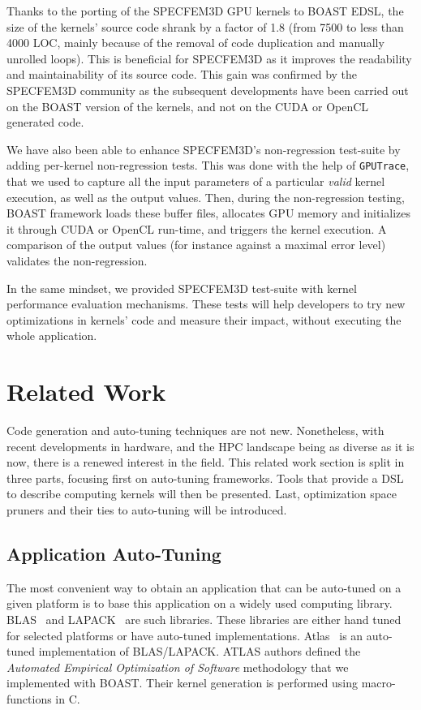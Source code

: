 \documentclass{IEEEtran}
\newcommand{\code}[1]{\texttt{#1}}
\begin{document}
Thanks to the porting of the SPECFEM3D GPU kernels to BOAST EDSL, the size of the
kernels' source code shrank by a factor of 1.8 (from 7500 to less than
4000 LOC, mainly because of the removal of code duplication and
manually unrolled loops). This is beneficial for SPECFEM3D as it
improves the readability and maintainability of its source code. This
gain was confirmed by the SPECFEM3D community as the subsequent
developments have been carried out on the BOAST version of the
kernels, and not on the CUDA or OpenCL generated code. 

We have also been able to enhance SPECFEM3D's non-regression test-suite
by adding per-kernel non-regression tests. This was done with the help
of \code{GPUTrace}, that we used to capture all the input parameters
of a particular \emph{valid} kernel execution, as well as the output
values. Then, during the non-regression testing, BOAST framework
loads these buffer files, allocates GPU memory and initializes it through
CUDA or OpenCL run-time, and triggers the kernel execution. A comparison
of the output values (for instance against a maximal error level)
validates the non-regression.

In the same mindset, we provided SPECFEM3D test-suite with kernel
performance evaluation mechanisms. These tests will help developers to
try new optimizations in kernels' code and measure their impact,
without executing the whole application.

\section{Related Work\label{sec:related}}

Code generation and auto-tuning techniques are not new. Nonetheless, with recent
developments in hardware, and the HPC landscape being as diverse as it is now,
there is a renewed interest in the field. This related work section is split in
three parts, focusing first on auto-tuning frameworks. Tools that provide a DSL
to describe computing kernels will then be presented. Last, optimization space
pruners and their ties to auto-tuning will be introduced.

\subsection{Application Auto-Tuning} 

The most convenient way to obtain an application that can be auto-tuned on a
given platform is to base this application on a widely used computing library.
BLAS~\cite{dongarra1990set} and LAPACK~\cite{laug} are such libraries. These
libraries are either hand tuned for selected platforms or have auto-tuned
implementations. Atlas~\cite{whaley04} is an auto-tuned implementation of
BLAS/LAPACK. ATLAS authors defined the \emph{Automated Empirical Optimization of
Software} methodology that we implemented with BOAST. Their kernel generation is
performed using macro-functions in C.
\end{document}
